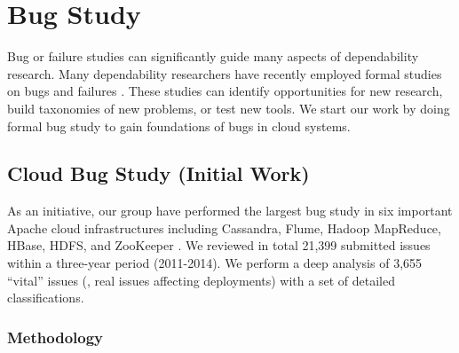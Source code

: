 \section{Bug Study}

Bug or failure studies can significantly guide many aspects of dependability
research. Many dependability researchers have recently employed formal studies
on bugs and failures \cite{Guo+13-CureIsWorse, Li+13-ScopeBugStudy}. These
studies can identify opportunities for new research, build taxonomies of new
problems, or test new tools. We start our work by doing formal bug study to gain
foundations of bugs in cloud systems.

\subsection{Cloud Bug Study (Initial Work)}

As an initiative, our group have performed the largest bug study in six
important Apache cloud infrastructures including Cassandra, Flume, Hadoop
MapReduce, HBase, HDFS, and ZooKeeper \cite{Gunawi+14-Cbs}. We reviewed in total
21,399 submitted issues within a three-year period (2011-2014).  We perform a
deep analysis of 3,655 ``vital'' issues (\ie, real issues affecting deployments)
with a set of detailed classifications.  \subsubsection{Methodology}



